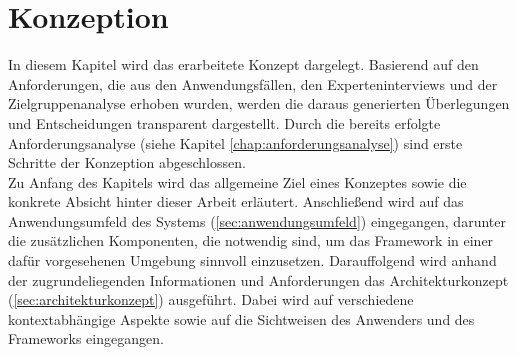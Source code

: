 \chapter{Konzeption}
\label{chap:konzept}
    In diesem Kapitel wird das erarbeitete Konzept dargelegt. Basierend auf den 
    Anforderungen, die aus den Anwendungsfällen, den Experteninterviews und der Zielgruppenanalyse 
    erhoben wurden, werden die daraus generierten Überlegungen und Entscheidungen transparent 
    dargestellt. Durch die bereits erfolgte Anforderungsanalyse (siehe Kapitel \ref{chap:anforderungsanalyse})
    sind erste Schritte der Konzeption abgeschlossen. 
    \\
    Zu Anfang des Kapitels wird das allgemeine Ziel eines Konzeptes sowie die konkrete Absicht hinter dieser Arbeit 
    erläutert. Anschließend 
    wird auf das Anwendungsumfeld des Systems (\ref{sec:anwendungsumfeld}) eingegangen, darunter die
    zusätzlichen Komponenten, die notwendig sind, um das Framework in einer dafür vorgesehenen Umgebung sinnvoll 
    einzusetzen. Darauffolgend wird anhand der zugrundeliegenden Informationen und Anforderungen das 
    Architekturkonzept (\ref{sec:architekturkonzept}) ausgeführt. 
    Dabei wird auf verschiedene kontextabhängige Aspekte sowie auf die Sichtweisen des Anwenders und des Frameworks eingegangen.


